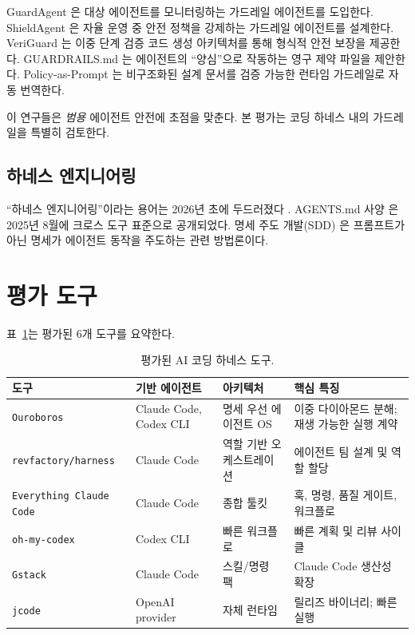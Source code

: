 \documentclass[11pt,a4paper]{article}
\newcommand{\tool}[1]{\texttt{#1}}
\begin{document}
GuardAgent \cite{xiang2025guardagent}은 대상 에이전트를 모니터링하는 가드레일 에이전트를 도입한다.
ShieldAgent \cite{chen2025shieldagent}은 자율 운영 중 안전 정책을 강제하는 가드레일 에이전트를 설계한다.
VeriGuard \cite{veriguard2025}는 이중 단계 검증 코드 생성 아키텍처를 통해 형식적 안전 보장을 제공한다.
GUARDRAILS.md \cite{guardrailsmd2026}는 에이전트의 ``양심''으로 작동하는 영구 제약 파일을 제안한다.
Policy-as-Prompt \cite{policyasprompt2025}는 비구조화된 설계 문서를 검증 가능한 런타임 가드레일로 자동 번역한다.

이 연구들은 \emph{범용} 에이전트 안전에 초점을 맞춘다.
본 평가는 코딩 하네스 내의 가드레일을 특별히 검토한다.

\subsection{하네스 엔지니어링}

``하네스 엔지니어링''이라는 용어는 2026년 초에 두드러졌다 \cite{augment2026harness, openai2026agents}.
AGENTS.md 사양 \cite{agentsmd2025}은 2025년 8월에 크로스 도구 표준으로 공개되었다.
명세 주도 개발(SDD) \cite{github2025speckit}은 프롬프트가 아닌 명세가 에이전트 동작을 주도하는 관련 방법론이다.

\section{평가 도구}
\label{sec:tools}

표~\ref{tab:tools}는 평가된 6개 도구를 요약한다.

\begin{table}[t]
\centering
\caption{평가된 AI 코딩 하네스 도구.}
\label{tab:tools}
\small
\begin{tabular}{@{}p{2.8cm}p{2.5cm}p{3.0cm}p{4.5cm}@{}}
\toprule
\textbf{도구} & \textbf{기반 에이전트} & \textbf{아키텍처} & \textbf{핵심 특징} \\
\midrule
\tool{Ouroboros} \cite{ouroboros2026} & Claude Code, Codex CLI & 명세 우선 에이전트 OS & 이중 다이아몬드 분해; 재생 가능한 실행 계약 \\
\tool{revfactory/harness} \cite{revfactory2026} & Claude Code & 역할 기반 오케스트레이션 & 에이전트 팀 설계 및 역할 할당 \\
\tool{Everything Claude Code} \cite{ecc2026} & Claude Code & 종합 툴킷 & 훅, 명령, 품질 게이트, 워크플로 \\
\tool{oh-my-codex} \cite{ohmycodex2026} & Codex CLI & 빠른 워크플로 & 빠른 계획 및 리뷰 사이클 \\
\tool{Gstack} \cite{gstack2026} & Claude Code & 스킬/명령 팩 & Claude Code 생산성 확장 \\
\tool{jcode} \cite{jcode2026} & OpenAI provider & 자체 런타임 & 릴리즈 바이너리; 빠른 실행 \\
\bottomrule
\end{tabular}
\end{table}
\end{document}
